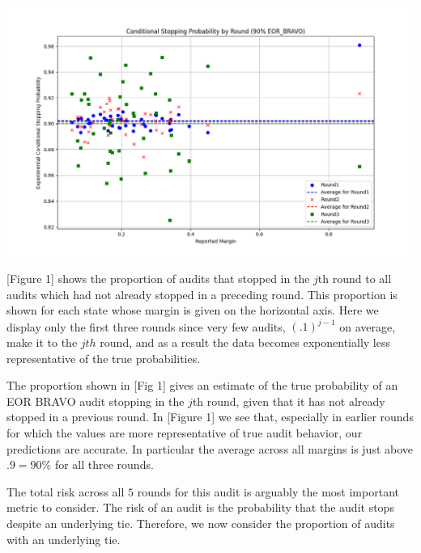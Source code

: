\documentclass{article}
\begin{document}
\begin{center}
\includegraphics[scale=.41]{eor_bravo_90perc_10^4_corrected/cond_sprob_first_3_rounds.png}
\end{center}
[Figure 1] shows the proportion of audits that stopped in the $j$th round
to all audits which had not already stopped in a preceding round.
This proportion is shown for each state whose margin is given on the 
horizontal axis.
Here we display only the first three rounds
since very few audits, $(.1)^{j-1}$ on average, 
make it to the $jth$ round, 
and as a result the data becomes exponentially less representative
of the true probabilities.

The proportion shown in [Fig 1] gives an estimate
of the true probability of an EOR BRAVO audit stopping in the $j$th round,
given that it has not already stopped in a previous round. 
In [Figure 1] we see that, especially in earlier rounds for which 
the values are more representative of true audit behavior, 
our predictions are accurate.
In particular the average across all margins is just above $.9=90\%$ for
all three rounds.

The total risk across all $5$ rounds for this audit is arguably
the most important metric to consider.
The risk of an audit is the probability that the audit
stops despite an underlying tie. 
Therefore, we now consider the proportion of audits with an underlying
tie.
\end{document}
